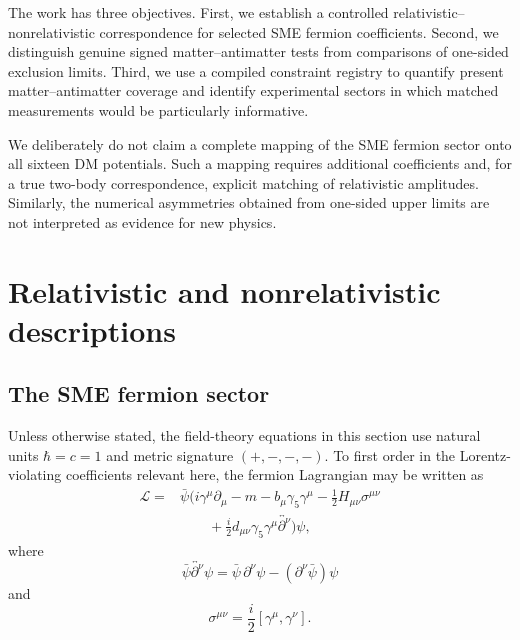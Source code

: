 \documentclass[aps,prd,reprint,superscriptaddress,nofootinbib]{revtex4-2}
\begin{document}
	The work has three objectives. First, we establish a controlled
	relativistic--nonrelativistic correspondence for selected SME fermion
	coefficients. Second, we distinguish genuine signed matter--antimatter
	tests from comparisons of one-sided exclusion limits. Third, we use a
	compiled constraint registry to quantify present matter--antimatter
	coverage and identify experimental sectors in which matched
	measurements would be particularly informative.
	
	We deliberately do not claim a complete mapping of the SME fermion
	sector onto all sixteen DM potentials. Such a mapping requires additional
	coefficients and, for a true two-body correspondence, explicit matching
	of relativistic amplitudes. Similarly, the numerical asymmetries
	obtained from one-sided upper limits are not interpreted as evidence for
	new physics.
	
	\section{Relativistic and nonrelativistic descriptions}
	
	\subsection{The SME fermion sector}
	
	Unless otherwise stated, the field-theory equations in this section use
	natural units $\hbar=c=1$ and metric signature $(+,-,-,-)$. To first
	order in the Lorentz-violating coefficients relevant here, the fermion
	Lagrangian may be written as
	\begin{equation}
		\begin{aligned}
			\mathcal{L}
			={}&\bar\psi\Big(
			i\gamma^\mu\partial_\mu-m
			-b_\mu\gamma_5\gamma^\mu
			-\tfrac{1}{2}H_{\mu\nu}\sigma^{\mu\nu}\\
			&\qquad+\tfrac{i}{2}d_{\mu\nu}
			\gamma_5\gamma^\mu
			\overleftrightarrow{\partial^\nu}
			\Big)\psi ,
		\end{aligned}
		\label{eq:SMEL}
	\end{equation}
	where
	\begin{equation}
		\bar\psi\overleftrightarrow{\partial^\nu}\psi
		=
		\bar\psi\,\partial^\nu\psi
		-
		(\partial^\nu\bar\psi)\psi
	\end{equation}
	and
	\begin{equation}
		\sigma^{\mu\nu}
		=
		\frac{i}{2}[\gamma^\mu,\gamma^\nu].
	\end{equation}
	
\end{document}
